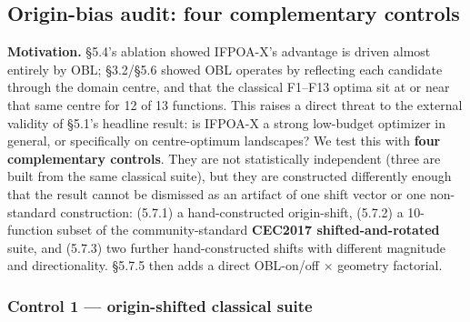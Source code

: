 \documentclass[preprint,12pt]{elsarticle}
\begin{document}
\subsection{Origin-bias audit: four complementary controls}
\label{subsec5-7}

\textbf{Motivation.} \S5.4's ablation showed IFPOA-X's advantage is driven almost entirely by OBL; \S3.2/\S5.6 showed OBL operates by reflecting each candidate through the domain centre, and that the classical F1--F13 optima sit at or near that same centre for 12 of 13 functions. This raises a direct threat to the external validity of \S5.1's headline result: is IFPOA-X a strong low-budget optimizer in general, or specifically on centre-optimum landscapes? We test this with \textbf{four complementary controls}. They are not statistically independent (three are built from the same classical suite), but they are constructed differently enough that the result cannot be dismissed as an artifact of one shift vector or one non-standard construction: (5.7.1) a hand-constructed origin-shift, (5.7.2) a 10-function subset of the community-standard \textbf{CEC2017 shifted-and-rotated} suite, and (5.7.3) two further hand-constructed shifts with different magnitude and directionality. \S5.7.5 then adds a direct OBL-on/off $\times$ geometry factorial.

\subsubsection{Control 1 --- origin-shifted classical suite}
\label{subsubsec5-7-1}
\end{document}
